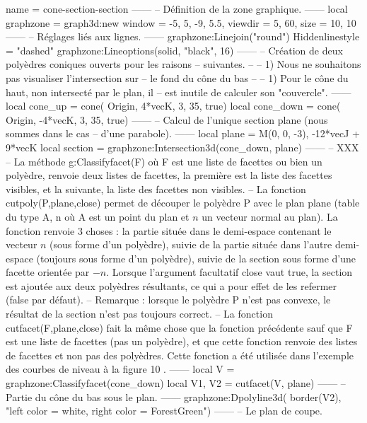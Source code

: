\documentclass[varwidth, border = 3pt]{standalone}
\begin{document}
\begin{luadraw}{name = cone-section-section}
------
-- Définition de la zone graphique.
------
    local graphzone = graph3d:new{
        window  = {-5, 5, -9, 5.5},
        viewdir = {5, 60},
        size    = {10, 10}
    }
------
-- Réglages liés aux lignes.
------
    graphzone:Linejoin("round")
    Hiddenlinestyle = "dashed"
    graphzone:Lineoptions(solid, "black", 16)
------
-- Création de deux polyèdres coniques ouverts pour les raisons
-- suivantes.
--
--     1) Nous ne souhaitons pas visualiser l'intersection sur
--     le fond du cône du bas
--
--     1) Pour le cône du haut, non intersecté par le plan, il
--     est inutile de calculer son "couvercle".
------
    local cone_up = cone(
        Origin, 4*vecK, 3, 35,
        true)
    local cone_down = cone(
        Origin, -4*vecK, 3, 35,
        true)
------
-- Calcul de l'unique section plane (nous sommes dans le cas
-- d'une parabole).
------
    local plane   = {M(0, 0, -3), -12*vecJ + 9*vecK}
    local section = graphzone:Intersection3d(cone_down, plane)
------
-- XXX
-- La méthode g:Classifyfacet(F) où F est une liste de facettes ou bien un polyèdre, renvoie deux listes de facettes, la première est la liste des facettes visibles, et la suivante, la liste des facettes non visibles.
-- La fonction cutpoly(P,plane,close) permet de découper le polyèdre P avec le plan plane (table du type {A}, n où A est un point du plan et $n$ un vecteur normal au plan). La fonction renvoie 3 choses : la partie située dans le demi-espace contenant le vecteur $n$ (sous forme d'un polyèdre), suivie de la partie située dans l'autre demi-espace (toujours sous forme d'un polyèdre), suivie de la section sous forme d'une facette orientée par $-n$. Lorsque l'argument facultatif close vaut true, la section est ajoutée aux deux polyèdres résultants, ce qui a pour effet de les refermer (false par défaut).
-- Remarque : lorsque le polyèdre P n'est pas convexe, le résultat de la section n'est pas toujours correct.
-- La fonction cutfacet(F,plane,close) fait la même chose que la fonction précédente sauf que F est une liste de facettes (pas un polyèdre), et que cette fonction renvoie des listes de facettes et non pas des polyèdres. Cette fonction a été utilisée dans l'exemple des courbes de niveau à la figure 10 .
------
    local V      = graphzone:Classifyfacet(cone_down)
    local V1, V2 = cutfacet(V, plane)
------
-- Partie du cône du bas sous le plan.
------
    graphzone:Dpolyline3d(
        border(V2),
        "left color = white, right color = ForestGreen")
------
-- Le plan de coupe.

\end{luadraw}
\end{document}
